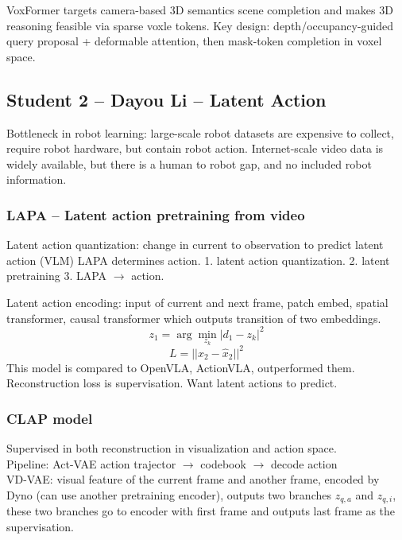 VoxFormer targets camera-based 3D semantics scene completion and makes 3D reasoning feasible via sparse voxle tokens. Key design: depth/occupancy-guided query proposal + deformable attention, then mask-token completion in voxel space.

\subsection{Student 2 -- Dayou Li -- Latent Action}

Bottleneck in robot learning: large-scale robot datasets are expensive to collect, require robot hardware, but contain robot action. Internet-scale video data is widely available, but there is a human to robot gap, and no included robot information.

\subsubsection{LAPA -- Latent action pretraining from video}
Latent action quantization: change in current to observation to predict latent action (VLM) LAPA determines action. 1. latent action quantization. 2. latent pretraining 3. LAPA $\rightarrow$ action.

Latent action encoding: input of current and next frame, patch embed, spatial transformer, causal transformer which outputs transition of two embeddings.
\[
    z_1 = \arg \min_{z_k} |d_1 - z_k|^2
\]
\[
    L = ||x_2 - \hat{x}_2||^2
\]
This model is compared to OpenVLA, ActionVLA, outperformed them. \\

Reconstruction loss is supervisation. Want latent actions to predict.

\subsubsection{CLAP model}
Supervised in both reconstruction in visualization and action space. \\

Pipeline: Act-VAE action trajector $\rightarrow$ codebook $\rightarrow$ decode action \\

VD-VAE: visual feature of the current frame and another frame, encoded by Dyno (can use another pretraining encoder), outputs two branches $z_{q, a}$ and $z_{q, i}$, these two branches go to encoder with first frame and outputs last frame as the supervisation. \\

